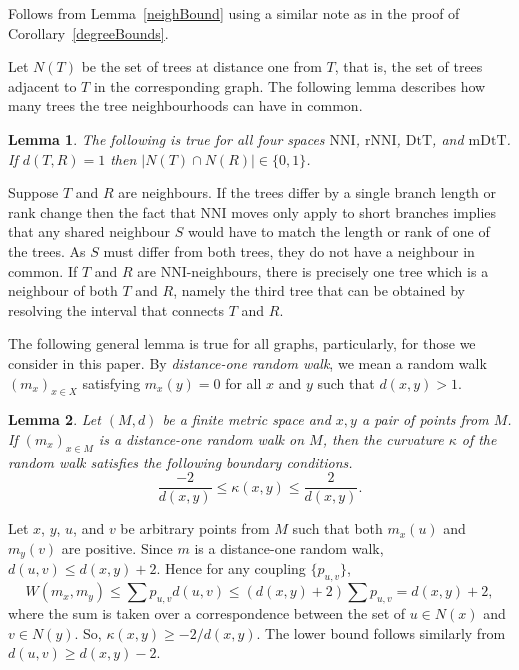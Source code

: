 \documentclass{amsart}
\newtheorem{lemma}{Lemma}
\newcommand{\dts}{\mathrm{DtT}}
\newcommand{\nni}{\mathrm{NNI}}
\newcommand{\rnni}{\mathrm{rNNI}}
\newcommand{\mdts}{\mathrm{mDtT}}
\begin{document}
\proof
Follows from Lemma~\ref{neighBound} using a similar note as in the proof of Corollary~\ref{degreeBounds}.
\endproof

Let $N(T)$ be the set of trees at distance one from $T$, that is, the set of trees adjacent to $T$ in the corresponding graph.
The following lemma describes how many trees the tree neighbourhoods can have in common.

\begin{lemma}\label{intersecNeighb}
The following is true for all four spaces $\nni$, $\rnni$, $\dts$, and $\mdts$.
If $d(T,R) = 1$ then $|N(T)\cap N(R)|\in\{0,1\}$.
\end{lemma}

\proof
Suppose $T$ and $R$ are neighbours.
If the trees differ by a single branch length or rank change then the fact that NNI moves only apply to short branches implies that any shared neighbour $S$ would have to match the length or rank of one of the trees.
As $S$ must differ from both trees, they do not have a neighbour in common.
If $T$ and $R$ are NNI-neighbours, there is precisely one tree which is a neighbour of both $T$ and $R$, namely the third tree that can be obtained by resolving the interval that connects $T$ and $R$.
\endproof

The following general lemma is true for all graphs, particularly, for those we consider in this paper.
By {\em distance-one random walk}, we mean a random walk $(m_x)_{x \in X}$ satisfying $m_x(y) = 0$ for all $x$ and $y$ such that $d(x,y) > 1$.

\begin{lemma}\label{curvBoundGeneral}
Let $(M,d)$ be a finite metric space and $x,y$ a pair of points from $M$.
If $(m_x)_{x \in M}$ is a distance-one random walk on $M$, then the curvature $\kappa$ of the random walk satisfies the following boundary conditions.
\[
\dfrac{-2}{d(x,y)} \leq \kappa(x,y) \leq \dfrac{2}{d(x,y)}.
\]
\end{lemma}

\proof
Let $x$, $y$, $u$, and $v$ be arbitrary points from $M$ such that both $m_x(u)$ and $m_y(v)$ are positive.
Since $m$ is a distance-one random walk, $d(u,v) \leq d(x,y) + 2$.
Hence for any coupling $\{p_{u,v}\}$,
\[
W(m_x,m_y) \leq \sum p_{u,v} d(u,v) \leq (d(x,y)+2)\sum p_{u,v} = d(x,y) + 2,
\]
where the sum is taken over a correspondence between the set of $u \in N(x)$ and $v \in N(y)$.
So, $\kappa(x,y) \geq - 2/d(x,y)$.
The lower bound follows similarly from $d(u,v) \geq d(x,y) - 2$.
\endproof
\end{document}
